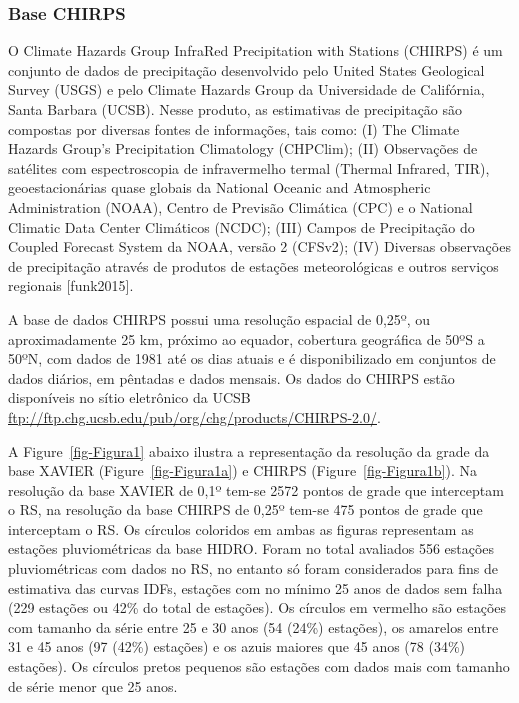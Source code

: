 \documentclass[
]{agujournal2019}
\begin{document}
\subsubsection{Base CHIRPS}\label{base-chirps}

O Climate Hazards Group InfraRed Precipitation with Stations (CHIRPS) é
um conjunto de dados de precipitação desenvolvido pelo United States
Geological Survey (USGS) e pelo Climate Hazards Group da Universidade de
Califórnia, Santa Barbara (UCSB). Nesse produto, as estimativas de
precipitação são compostas por diversas fontes de informações, tais
como: (I) The Climate Hazards Group's Precipitation Climatology
(CHPClim); (II) Observações de satélites com espectroscopia de
infravermelho termal (Thermal Infrared, TIR), geoestacionárias quase
globais da National Oceanic and Atmospheric Administration (NOAA),
Centro de Previsão Climática (CPC) e o National Climatic Data Center
Climáticos (NCDC); (III) Campos de Precipitação do Coupled Forecast
System da NOAA, versão 2 (CFSv2); (IV) Diversas observações de
precipitação através de produtos de estações meteorológicas e outros
serviços regionais {[}funk2015{]}.

A base de dados CHIRPS possui uma resolução espacial de 0,25º, ou
aproximadamente 25 km, próximo ao equador, cobertura geográfica de 50ºS
a 50ºN, com dados de 1981 até os dias atuais e é disponibilizado em
conjuntos de dados diários, em pêntadas e dados mensais. Os dados do
CHIRPS estão disponíveis no sítio eletrônico da UCSB
\url{ftp://ftp.chg.ucsb.edu/pub/org/chg/products/CHIRPS-2.0/}.

A Figure~\ref{fig-Figura1} abaixo ilustra a representação da resolução
da grade da base XAVIER (Figure~\ref{fig-Figura1a}) e CHIRPS
(Figure~\ref{fig-Figura1b}). Na resolução da base XAVIER de 0,1º tem-se
2572 pontos de grade que interceptam o RS, na resolução da base CHIRPS
de 0,25º tem-se 475 pontos de grade que interceptam o RS. Os círculos
coloridos em ambas as figuras representam as estações pluviométricas da
base HIDRO. Foram no total avaliados 556 estações pluviométricas com
dados no RS, no entanto só foram considerados para fins de estimativa
das curvas IDFs, estações com no mínimo 25 anos de dados sem falha (229
estações ou 42\% do total de estações). Os círculos em vermelho são
estações com tamanho da série entre 25 e 30 anos (54 (24\%) estações),
os amarelos entre 31 e 45 anos (97 (42\%) estações) e os azuis maiores
que 45 anos (78 (34\%) estações). Os círculos pretos pequenos são
estações com dados mais com tamanho de série menor que 25 anos.
\end{document}
